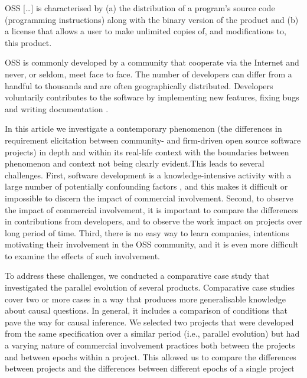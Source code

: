 \documentclass[a4paper,11pt]{article}
\begin{document}
{%
\begin{displayquote}
OSS [\dots] is characterised by (a) the distribution of a program's source code (programming instructions) along with the binary version of the product and (b) a license that allows a user to make unlimited copies of, and modifications to, this product. \cite{DiBonaChrisandOckman1999, Maccormack2006}
\end{displayquote}
OSS is commonly developed by a community that cooperate via the Internet and never, or seldom, meet face to face. The number of developers can differ from a handful to thousands and are often geographically distributed. Developers voluntarily contributes to the software by implementing new features, fixing bugs and writing documentation \cite{Maccormack2006}.

In this article we investigate a contemporary phenomenon (the differences in requirement elicitation between community- and firm-driven open source software projects) in depth and within its real-life context with the boundaries between phenomenon and context not being clearly evident\cite{RobertK1994}.This leads to several challenges. First, software development is a knowledge-intensive activity with a large number of potentially confounding factors \cite{Curtis1986}, and this makes it difficult or impossible to discern the impact of commercial involvement. Second, to observe the impact of commercial involvement, it is important to compare the differences in contributions from developers, and to observe the work impact on projects over long period of time. Third, there is no easy way to learn companies, intentions motivating their involvement in the OSS community, and it is even more difficult to examine the effects of such involvement. 

To address these challenges, we conducted a comparative case study that investigated the parallel evolution of several products. Comparative case studies cover two or more cases in a way that produces more generalisable knowledge about causal questions\cite{Goodrick2014}. In general, it includes a comparison of conditions that pave the way for causal inference. We selected two projects that were developed from the same specification over a similar period (i.e., parallel evolution) but had a varying nature of commercial involvement practices both between the projects and between epochs within a project. This allowed us to compare the differences between projects and the differences between different epochs of a single project

}
\end{document}
